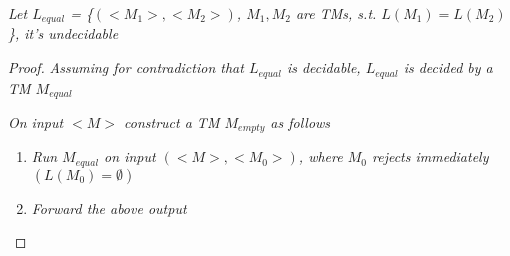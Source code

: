 \documentclass{article}
\begin{document}
\begin{lemma}
    \textit{Let $L_{equal}$ = \{$(<M_1>,<M_2>)$, $M_1,M_2$ are TMs, s.t.  $L(M_1) = L(M_2)$\}, it's undecidable}

    \begin{proof}
        \textit{Assuming for contradiction that $L_{equal}$ is decidable, $L_{equal}$ is decided by a TM $M_{equal}$}

        \textit{On input $<M>$ construct a TM $M_{empty}$ as follows}

        \begin{enumerate}
            \item \textit{Run $M_{equal}$ on input $(<M>,<M_0>)$, where $M_0$ rejects immediately $(L(M_0) = \emptyset)$}
            \item \textit{Forward the above output}
        \end{enumerate}
    \end{proof}
\end{lemma}


\ifx\allfiles\undefined
\end{document}
